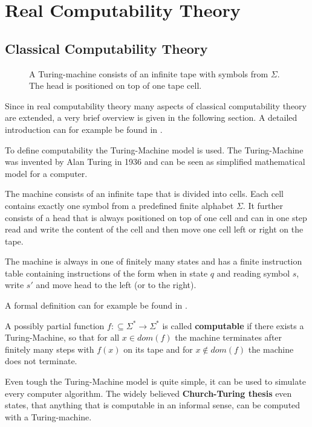 \section{Real Computability Theory}\label{sec:real computability}
\subsection{Classical Computability Theory}
 \begin{figure}[h]
   \centering
   
   \caption{A Turing-machine consists of an infinite tape with symbols from
   $\Sigma$. The head is positioned on top of one tape cell.}
 \end{figure}
 Since in real computability theory many aspects of classical computability theory are extended, 
 a very brief overview is given in the following section. 
 A detailed introduction can for example be found in \cite{computability}.

 To define computability the Turing-Machine model is used.
 The Turing-Machine was invented by Alan Turing in 1936 \cite{turing36} and can
 be seen as simplified mathematical model for a computer.

 The machine consists of an infinite tape that is divided into cells. 
 Each cell contains exactly one symbol from a predefined finite alphabet
 $\Sigma$.
 It further consists of a head that is always positioned on top of one cell 
 and can in one step read and write the content of the cell and then move one
 cell left or right on the tape.

 The machine is always in one of finitely many states and has a finite
 instruction table containing instructions of the form when in state $q$ and
 reading symbol $s$, write $s'$ and move head to the left (or to the right).

 A formal definition can for example be found in \cite{hopcroft2013}.
 
 \begin{definition}
 	A possibly partial function $f:\subseteq \Sigma^* \to \Sigma^*$ is called \textbf{computable} if there exists 
 	a Turing-Machine, so that for all $x \in dom(f)$ the machine terminates after finitely many steps with $f(x)$ on its 
 	tape and for $x \not \in dom(f)$ the machine does not terminate.
 \end{definition}

 Even tough the Turing-Machine model is quite simple, it can be used to
 simulate every computer algorithm.
 The widely believed \textbf{Church-Turing thesis} even states, that anything
 that is computable in an informal sense, can be computed with a
 Turing-machine.

